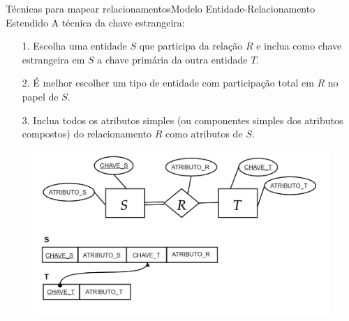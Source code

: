 \documentclass[t]{beamer}
\begin{document}

\begin{ftst}{Técnicas para mapear relacionamentos}{Modelo Entidade-Relacionamento Estendido}
A técnica da chave estrangeira:
\footnotesize
\begin{itemize}
    \item[1.]  Escolha uma entidade $S$ que participa da relação $R$ e inclua como chave estrangeira em $S$ a chave primária da outra entidade $T$. 
    \item[2.] É melhor escolher um tipo de entidade com participação total em $R$ no papel de $S$.
    \item[3.] Inclua todos os atributos simples (ou componentes simples dos atributos compostos) do relacionamento $R$ como atributos de $S$.
\end{itemize}
\begin{figure}
    \includegraphics[scale=0.15]{Figuras/03_06.png}
\end{figure}
\end{ftst}

\end{document}
